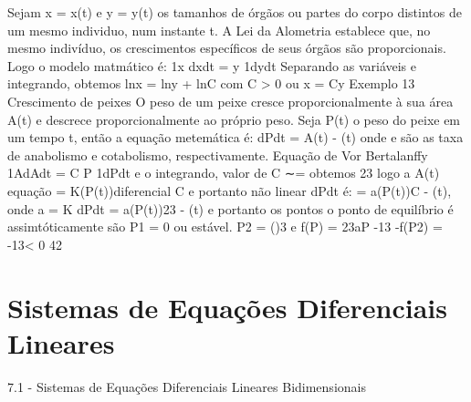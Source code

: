 {{{{{{{{{{{{{Sejam x = x(t) e y = y(t) os tamanhos de órgãos ou partes do corpo distintos de um mesmo individuo, num instante t. 
A Lei da Alometria establece que, no mesmo indivíduo, os crescimentos específicos de seus órgãos são proporcionais. Logo o modelo matmático é: 
1x 
dxdt = \alpha y 
1dydt Separando as variáveis e integrando, obtemos 
lnx = \alpha lny + lnC 
com C > 0 ou x = Cy\alpha  
Exemplo 13 Crescimento de peixes 
O peso de um peixe cresce proporcionalmente à sua área A(t) e descrece proporcionalmente ao próprio peso. Seja P(t) o peso do peixe em um tempo t, então a equação metemática é: 
dPdt = \alpha A(t) - \betaP(t) onde \alpha  e \beta são as taxa de anabolismo e cotabolismo, respectivamente. Equação de Vor Bertalanffy 
1AdAdt = C P 
1dPdt e o integrando, valor de C ∼= obtemos 23 logo a A(t) equação = K(P(t))diferencial C e portanto não linear dPdt é: 
= a(P(t))C - \betaP(t), onde a = \alpha K 
dPdt = a(P(t))23 - \betaP(t) 
e portanto os pontos o ponto de equilíbrio é assimtóticamente são P1 = 0 ou estável. 
P2 = (\betaa)3 e f(P) = 23aP 
-13 -\beta \Rightarrow  f(P2) = -13\beta < 0 
42 

\chapter{Sistemas de Equações Diferenciais Lineares}

7.1 - Sistemas de Equações Diferenciais Lineares Bidimensionais 

}}}}}}}}}}}}}
